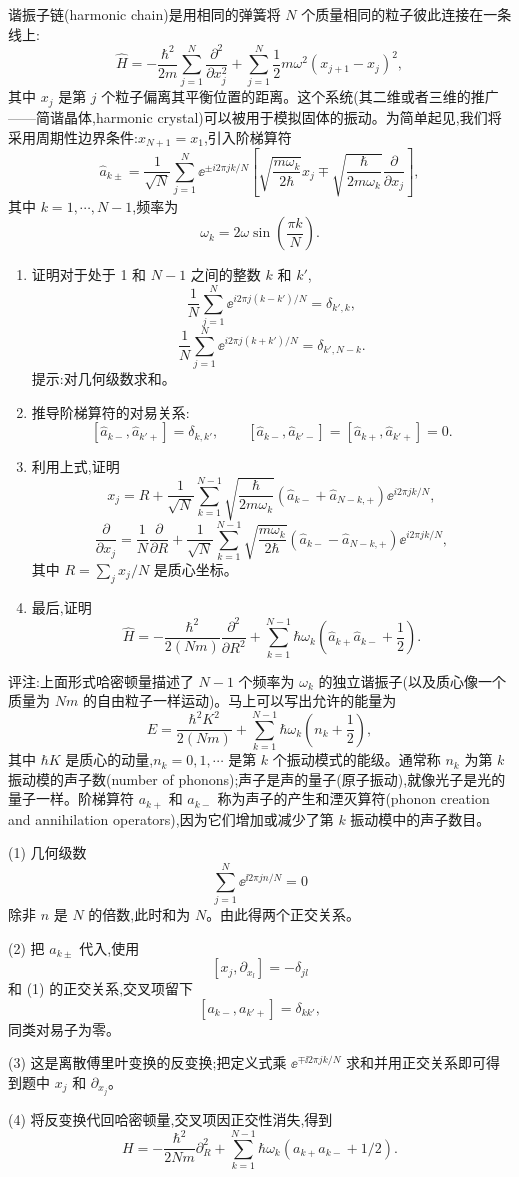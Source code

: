\begin{question}
谐振子链(harmonic chain)是用相同的弹簧将 $N$ 个质量相同的粒子彼此连接在一条线上:
\[
\hat H=-\frac{\hbar^2}{2m}\sum_{j=1}^{N}\frac{\partial^2}{\partial x_j^2}
+\sum_{j=1}^{N}\frac12 m\omega^2(x_{j+1}-x_j)^2,
\]
其中 $x_j$ 是第 $j$ 个粒子偏离其平衡位置的距离。这个系统(其二维或者三维的推广——简谐晶体,harmonic crystal)可以被用于模拟固体的振动。为简单起见,我们将采用周期性边界条件:$x_{N+1}=x_1$,引入阶梯算符
\[
\hat a_{k\pm}=\frac{1}{\sqrt N}\sum_{j=1}^{N}\ee^{\pm i2\pi jk/N}\left[\sqrt{\frac{m\omega_k}{2\hbar}}x_j\mp\sqrt{\frac{\hbar}{2m\omega_k}}\frac{\partial}{\partial x_j}\right],
\]
其中 $k=1,\cdots,N-1$,频率为
\[
\omega_k=2\omega\sin\left(\frac{\pi k}{N}\right).
\]
\begin{enumerate}
\item 证明对于处于 1 和 $N-1$ 之间的整数 $k$ 和 $k'$,
\[
\frac{1}{N}\sum_{j=1}^{N}\ee^{i2\pi j(k-k')/N}=\delta_{k',k},
\]
\[
\frac{1}{N}\sum_{j=1}^{N}\ee^{i2\pi j(k+k')/N}=\delta_{k',N-k}.
\]
提示:对几何级数求和。
\item 推导阶梯算符的对易关系:
\[
[\hat a_{k-},\hat a_{k'+}]=\delta_{k,k'},\qquad
[\hat a_{k-},\hat a_{k'-}]=[\hat a_{k+},\hat a_{k'+}]=0.
\]
\item 利用上式,证明
\[
x_j=R+\frac{1}{\sqrt N}\sum_{k=1}^{N-1}\sqrt{\frac{\hbar}{2m\omega_k}}(\hat a_{k-}+\hat a_{N-k,+})\ee^{i2\pi jk/N},
\]
\[
\frac{\partial}{\partial x_j}=\frac{1}{N}\frac{\partial}{\partial R}+\frac{1}{\sqrt N}\sum_{k=1}^{N-1}\sqrt{\frac{m\omega_k}{2\hbar}}(\hat a_{k-}-\hat a_{N-k,+})\ee^{i2\pi jk/N},
\]
其中 $R=\sum_j x_j/N$ 是质心坐标。
\item 最后,证明
\[
\hat H=-\frac{\hbar^2}{2(Nm)}\frac{\partial^2}{\partial R^2}+\sum_{k=1}^{N-1}\hbar\omega_k\left(\hat a_{k+}\hat a_{k-}+\frac12\right).
\]
\end{enumerate}
评注:上面形式哈密顿量描述了 $N-1$ 个频率为 $\omega_k$ 的独立谐振子(以及质心像一个质量为 $Nm$ 的自由粒子一样运动)。马上可以写出允许的能量为
\[
E=\frac{\hbar^2K^2}{2(Nm)}+\sum_{k=1}^{N-1}\hbar\omega_k\left(n_k+\frac12\right),
\]
其中 $\hbar K$ 是质心的动量,$n_k=0,1,\cdots$ 是第 $k$ 个振动模式的能级。通常称 $n_k$ 为第 $k$ 振动模的声子数(number of phonons);声子是声的量子(原子振动),就像光子是光的量子一样。阶梯算符 $a_{k+}$ 和 $a_{k-}$ 称为声子的产生和湮灭算符(phonon creation and annihilation operators),因为它们增加或减少了第 $k$ 振动模中的声子数目。
\end{question}
\begin{solution}

(1) 几何级数
\[
\sum_{j=1}^N\ee^{\ii2\pi jn/N}=0
\]
除非 $n$ 是 $N$ 的倍数,此时和为 $N$。由此得两个正交关系。

(2) 把 $a_{k\pm}$ 代入,使用
\[
[x_j,\partial_{x_l}]=-\delta_{jl}
\]
和 (1) 的正交关系,交叉项留下
\[
[a_{k-},a_{k'+}]=\delta_{kk'},
\]
同类对易子为零。

(3) 这是离散傅里叶变换的反变换;把定义式乘 $\ee^{\mp\ii2\pi jk/N}$ 求和并用正交关系即可得到题中 $x_j$ 和 $\partial_{x_j}$。

(4) 将反变换代回哈密顿量,交叉项因正交性消失,得到
\[
H=-\frac{\hbar^2}{2Nm}\partial_R^2+
\sum_{k=1}^{N-1}\hbar\omega_k(a_{k+}a_{k-}+1/2).
\]

\end{solution}

